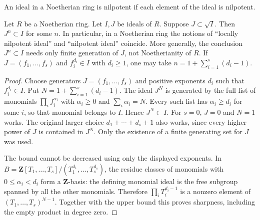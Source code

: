 \begin{lemma}
\label{lemma-Noetherian-power}
\begin{slogan}
An ideal in a Noetherian ring is nilpotent if each element
of the ideal is nilpotent.
\end{slogan}
Let $R$ be a Noetherian ring. Let $I, J$ be ideals of $R$.
Suppose $J \subset \sqrt{I}$. Then $J^n \subset I$ for some $n$.
In particular, in a Noetherian ring the notions of
``locally nilpotent ideal''
and ``nilpotent ideal'' coincide.
More generally, the conclusion $J^n\subset I$ needs only finite
generation of $J$, not Noetherianity of $R$. If
$J=(f_1,\ldots,f_s)$ and $f_i^{d_i}\in I$ with $d_i\geq1$, one may
take $n=1+\sum_{i=1}^s(d_i-1)$.
\end{lemma}

\begin{proof}
Choose generators $J=(f_1,\ldots,f_s)$ and positive exponents
$d_i$ such that $f_i^{d_i}\in I$. Put $N=1+\sum_{i=1}^s(d_i-1)$.
The ideal $J^N$ is generated by the full list of monomials
$\prod_i f_i^{\alpha_i}$ with $\alpha_i\geq0$ and $\sum_i\alpha_i=N$.
Every such list has $\alpha_i\geq d_i$ for some $i$, so that monomial
belongs to $I$. Hence $J^N\subset I$. For $s=0$, $J=0$ and $N=1$
works. The original larger choice $d_1+\cdots+d_s+1$ also works,
since every higher power of $J$ is contained in $J^N$.
Only the existence of a finite generating set for $J$ was used.

\medskip\noindent
The bound cannot be decreased using only the displayed exponents.
In $B=\mathbf Z[T_1,\ldots,T_s]/(T_1^{d_1},\ldots,T_s^{d_s})$,
the residue classes of monomials with $0\leq\alpha_i<d_i$ form a
$\mathbf Z$-basis: the defining monomial ideal is the free subgroup
spanned by all the other monomials. Therefore
$\prod_i T_i^{d_i-1}$ is a nonzero element of
$(T_1,\ldots,T_s)^{N-1}$. Together with the upper bound this proves
sharpness, including the empty product in degree zero.
\end{proof}